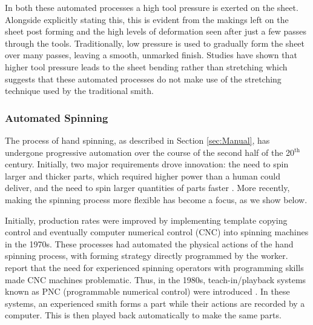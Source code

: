 In both these automated processes a high tool pressure is exerted on the sheet. Alongside explicitly stating this, this is evident from the makings left on the sheet post forming and the high levels of deformation seen after just a few passes through the tools. Traditionally, low pressure is used to gradually form the sheet over many passes, leaving a smooth, unmarked finish. Studies have shown that higher tool pressure leads to the sheet bending rather than stretching \citep{Bowen2021NumericalProcess} which suggests that these automated processes do not make use of the stretching technique used by the traditional smith.


\subsubsection{Automated Spinning} \label{sec:MechSpinning}

The process of hand spinning, as described in Section \ref{sec:Manual}, has undergone progressive automation over the course of the second half of the 20$^{\text{th}}$ century. Initially, two major requirements drove innovation: the need to spin larger and thicker parts, which required higher power than a human could deliver, and the need to spin larger quantities of parts faster \citep{Wong2003AProcesses}. More recently, making the spinning process more flexible has become a focus, as we show below.


Initially, production rates were improved by implementing template copying control and eventually computer numerical control (CNC) into spinning machines in the 1970s. These processes had automated the physical actions of the hand spinning process, with forming strategy directly programmed by the worker.  \cite{Wong2003AProcesses} report that the need for experienced spinning operators with programming skills made CNC machines problematic. Thus, in the 1980s, teach-in/playback systems known as PNC (programmable numerical control) were introduced \citep{Lloyd1986AnProspective}. In these systems, an experienced smith forms a part while their actions are recorded by a computer. This is then played back automatically to make the same parts. %

